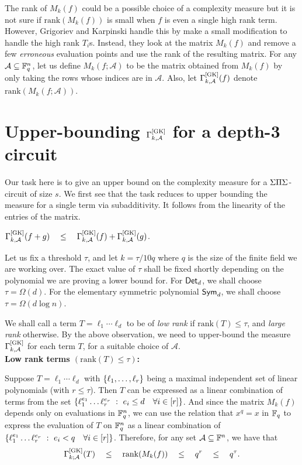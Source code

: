 The rank of $M_k(f)$ could be a possible choice of a complexity
measure but it is not sure if $\mathrm{rank}(M_k(f))$ is small when
$f$ is even a single high rank term. 
However, Grigoriev and Karpinski
handle this by make a small modification to handle the high rank
$T_i$s. 
Instead, they look at the matrix $M_k(f)$ and remove a few
\emph{erroneous} evaluation points and use the rank of the resulting
matrix. 
For any $\mathcal{A}\subseteq \mathbb{F}_q^{n}$, let us define
$M_k(f;\mathcal{A})$ to be the matrix obtained from $M_k(f)$ by only
taking the rows whose indices are in $\mathcal{A}$. 
Also, let
$\Gamma^{\mathrm{[GK]}}_{k,\mathcal{A}}(f)$ denote
$\mathrm{rank}(M_k(f;\mathcal{A}))$.

\section{Upper-bounding $\Gamma^{\mathrm{[GK]}}_{k,\mathcal{A}}$ for a depth-3 circuit}\label{sec:gk-upper-bound}

Our task here is to give an upper bound on the complexity measure for
a $\Sigma\Pi\Sigma$-circuit of size $s$. 
We first see that the task reduces to
upper bounding the measure for a single term via subadditivity. 
It
follows from the linearity of the entries of the matrix.

\begin{observation}\label{obs:GK-subadditivity}
  $\Gamma^{\mathrm{[GK]}}_{k,\mathcal{A}}(f + g) \quad\leq\quad
  \Gamma^{\mathrm{[GK]}}_{k,\mathcal{A}}(f) + \Gamma^{\mathrm{[GK]}}_{k,\mathcal{A}}(g)$.
\end{observation}

Let us fix a threshold $\tau$, and let $k = \tau/10q$ where $q$ is the size of the finite field we are working over.
The exact value of $\tau$ shall be fixed shortly depending on the polynomial we are proving a lower bound for. 
For $\operatorname{\mathsf{Det}}_d$, we shall choose $\tau = \Omega(d)$.
For the elementary symmetric polynomial $\operatorname{\mathsf{Sym}}_d$, we shall choose $\tau = \Omega(d \log n)$. 
 
We shall call a term $T = \ell_1\cdots \ell_d$ to be
of \emph{low rank} if $\mathrm{rank}(T) \leq \tau$, and \emph{large
  rank} otherwise. 
By the above observation, we need to upper-bound
the measure $\Gamma^{\mathrm{[GK]}}_{k,\mathcal{A}}$ for each term $T$, for a
suitable choice of $\mathcal{A}$.\\

\noindent 
{\bf Low rank terms $(\mathrm{rank}(T) \leq \tau)$:}

Suppose $T = \ell_1 \cdots \ell_d$ with $\left\{\ell_1, \dots,
  \ell_r\right\}$ being a maximal independent set of linear polynomials (with
$r \leq \tau$). 
Then $T$ can be expressed as a linear combination of
terms from the set $\left\{{\ell_1^{e_1}\dots \ell_r^{e_r}}\ : \ {e_i\leq d
  \quad \forall i\in [r]}\right\}$. 
And since the matrix $M_k(f)$ depends only
on evaluations in $\mathbb{F}_q^{n}$, we can use the relation that $x^q = x$
in $\mathbb{F}_q$ to express the evaluation of  $T$ on $\mathbb{F}_q^{n}$ as a linear
combination of $\left\{{\ell_1^{e_1}\dots \ell_r^{e_r}}\ : \ {e_i<q \quad
  \forall i\in [r]}\right\}$. 
Therefore, for any set $\mathcal{A}\subseteq
\mathbb{F}^{n}$, we have that
$$
\Gamma^{\mathrm{[GK]}}_{k;\mathcal{A}}(T) \quad \leq \quad
\mathrm{rank}(M_k(f)) \quad \leq \quad q^r \quad\leq \quad q^{\tau}.
$$


